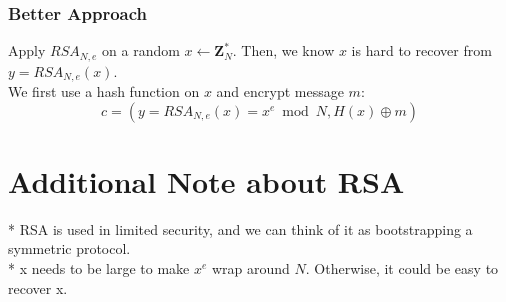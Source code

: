 \documentclass{scribe}
\begin{document}

\subsubsection{Better Approach}
Apply $RSA_{N,e}$ on a random $x \leftarrow \mathbf{Z}_N^*$. Then, we know $x$ is hard to recover from $y=RSA_{N,e}(x)$.
\\
We first use a hash function on $x$ and encrypt message $m$:
\[c = (y=RSA_{N,e}(x) = x^e \bmod N, H(x) \oplus m)\]  

\section{Additional Note about RSA}
* RSA is used in limited security, and we can think of it as bootstrapping a symmetric protocol.
\\
* x needs to be large to make $x^e$ wrap around $N$. Otherwise, it could be easy to recover x.


%

\end{document}
